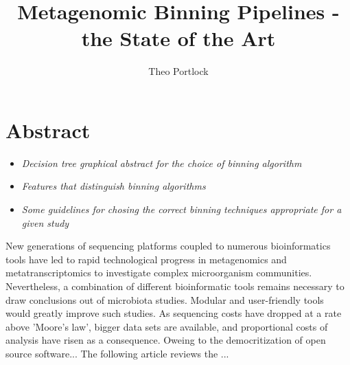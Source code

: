 \documentclass{article}
\title{Metagenomic Binning Pipelines - the State of the Art}
\author{Theo Portlock}
\begin{document}
\maketitle

\section{Abstract}
\begin{itemize}
	\item \emph{Decision tree graphical abstract for the choice of binning algorithm}
	\item \emph{Features that distinguish binning algorithms}
	\item \emph{Some guidelines for chosing the correct binning techniques appropriate for a given study}
\end{itemize}
New generations of sequencing platforms coupled to numerous bioinformatics tools have led to rapid technological progress in metagenomics and metatranscriptomics to investigate complex microorganism communities.
Nevertheless, a combination of different bioinformatic tools remains necessary to draw conclusions out of microbiota studies.
Modular and user-friendly tools would greatly improve such studies.
As sequencing costs have dropped at a rate above 'Moore's law', bigger data sets are available, and proportional costs of analysis have risen as a consequence.
Oweing to the democritization of open source software...
The following article reviews the ...
\end{document}
